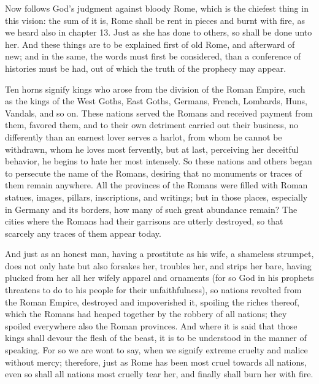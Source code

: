 Now follows God’s judgment against bloody Rome, which is the chiefest thing in this vision: the sum of it is, Rome shall be rent in pieces and burnt with fire, as we heard also in chapter 13. Just as she has done to others, so shall be done unto her. And these things are to be explained first of old Rome, and afterward of new; and in the same, the words must first be considered, than a conference of histories must be had, out of which the truth of the prophecy may appear.

Ten horns signify kings who arose from the division of the Roman Empire, such as the kings of the West Goths, East Goths, Germans, French, Lombards, Huns, Vandals, and so on. These nations served the Romans and received payment from them, favored them, and to their own detriment carried out their business, no differently than an earnest lover serves a harlot, from whom he cannot be withdrawn, whom he loves most fervently, but at last, perceiving her deceitful behavior, he begins to hate her most intensely. So these nations and others began to persecute the name of the Romans, desiring that no monuments or traces of them remain anywhere. All the provinces of the Romans were filled with Roman statues, images, pillars, inscriptions, and writings; but in those places, especially in Germany and its borders, how many of such great abundance remain? The cities where the Romans had their garrisons are utterly destroyed, so that scarcely any traces of them appear today.

And just as an honest man, having a prostitute as his wife, a shameless strumpet, does not only hate but also forsakes her, troubles her, and strips her bare, having plucked from her all her wifely apparel and ornaments (for so God in his prophets threatens to do to his people for their unfaithfulness), so nations revolted from the Roman Empire, destroyed and impoverished it, spoiling the riches thereof, which the Romans had heaped together by the robbery of all nations; they spoiled everywhere also the Roman provinces. And where it is said that those kings shall devour the flesh of the beast, it is to be understood in the manner of speaking. For so we are wont to say, when we signify extreme cruelty and malice without mercy; therefore, just as Rome has been most cruel towards all nations, even so shall all nations most cruelly tear her, and finally shall burn her with fire.

